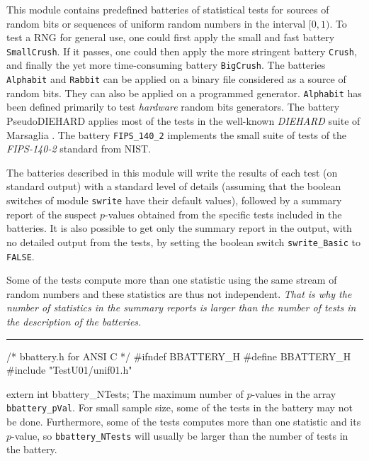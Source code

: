 
This module contains predefined batteries of statistical tests for
sources of random bits or sequences of uniform random numbers in
the interval $[0, 1)$.
To test a RNG for general use, one could first apply the
small and fast battery {\tt SmallCrush}.
If it passes, one could then apply the more stringent battery
{\tt Crush}, and finally the yet more time-consuming
battery {\tt BigCrush}.
The batteries {\tt Alphabit} and {\tt Rabbit} can be applied on a binary
file considered as a source of random bits. They can also be applied
on a programmed generator.  {\tt Alphabit} has been defined primarily to test
{\it hardware} random bits generators.
The battery {PseudoDIEHARD} applies most of the tests in
the well-known {\it DIEHARD\/} suite of Marsaglia \cite{rMAR96b}.
The battery {\tt FIPS\_140\_2} implements the small suite of tests
of the {\it FIPS-140-2} standard from NIST.

The batteries described in this module  will write the results of each test
(on standard output) with a standard level of details (assuming that the
 boolean switches of module {\tt swrite} have their default values),
followed by a summary  report of the suspect $p$-values obtained from the
 specific tests included in the batteries.
It is also possible to get only the summary report in the output,
with no detailed output from the tests,
by setting the boolean switch {\tt swrite\_Basic} to {\tt FALSE}.

Some of the tests compute more than one statistic using the same stream of
random numbers and these statistics are thus not independent.
\emph{That is why the number of statistics in the summary reports is larger than
the number of tests in the description of the batteries.}

\bigskip
\hrule
\code\hide
/* bbattery.h for ANSI C */
#ifndef BBATTERY_H
#define BBATTERY_H
\endhide
#include "TestU01/unif01.h"


extern int bbattery_NTests;
\endcode
  \tab The maximum number of $p$-values in the array {\tt bbattery\_pVal}.
  For small sample size, some of the tests in the battery may not be done.
  Furthermore, some of the tests computes more than one statistic and
  its $p$-value, so {\tt bbattery\_NTests} will usually be larger than
  the number of tests in the battery.
  \endtab
\code



